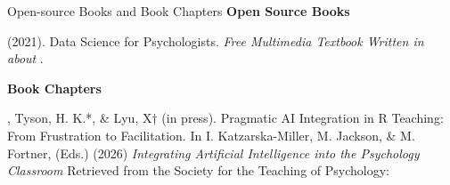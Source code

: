 

\begin{rSection}{\textrm{Open-source Books and Book Chapters}}%
{\large {\bf Open Source Books}}\begin{etaremune}
\item  \meb (2021). Data Science for Psychologists. \textit{Free Multimedia Textbook Written in \R about \R}. 
\end{etaremune}
{\large \bf Book Chapters}
\begin{etaremune}
\item \meb, Tyson, H. K.*, \& Lyu, X$\dagger$ (in press). Pragmatic AI Integration in R Teaching: From Frustration to Facilitation.  In I. Katzarska-Miller, M. Jackson, \& M. Fortner,  (Eds.) (2026) \textit{Integrating Artificial Intelligence into the Psychology Classroom} Retrieved from the Society for the Teaching of Psychology: \href{https://teachpsych.org/ebooks/index}{\small\color{blue}{teachpsych.org/ebooks/}}
\end{etaremune}
\end{rSection}%
